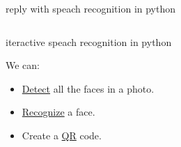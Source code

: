 \clearpage
\begin{code}
	\inputminted{python}{codes/src6/6/voices/voices2.py}
	\caption{reply with speach recognition in python}
\end{code}

\begin{code}
	\inputminted{python}{codes/src6/6/voices/voices3.py}
	\caption{iteractive speach recognition in python}
\end{code}

We can:
\begin{itemize}
	\item \href{codes/src6/6/faces/detect.py}{Detect} all the faces in a photo.
	\item \href{codes/src6/6/faces/recognize.py}{Recognize} a face.
	\item Create a \href{codes/src6/6/qr/qr.py}{QR} code.
\end{itemize}





